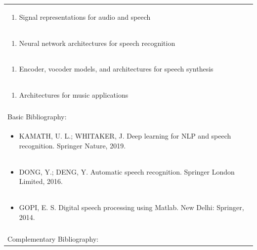 \documentclass[11pt]{article}
\begin{document}
\begin{center}
\begin{longtable}{|p{4cm}|p{4cm}|p{4cm}|p{4cm}|}
\multicolumn{4}{|p{\dimexpr 16cm + 6\tabcolsep\relax}|}{\begin{enumerate}[start=2]\item Signal representations for audio and speech\end{enumerate}}\\
\multicolumn{4}{|p{\dimexpr 16cm + 6\tabcolsep\relax}|}{\begin{enumerate}[start=3]\item Neural network architectures for speech recognition\end{enumerate}}\\
\multicolumn{4}{|p{\dimexpr 16cm + 6\tabcolsep\relax}|}{\begin{enumerate}[start=4]\item Encoder, vocoder models, and architectures for speech synthesis\end{enumerate}}\\
\multicolumn{4}{|p{\dimexpr 16cm + 6\tabcolsep\relax}|}{\begin{enumerate}[start=5]\item Architectures for music applications\end{enumerate}}\\
\multicolumn{4}{|p{\dimexpr 16cm + 6\tabcolsep\relax}|}{}\\
\hline
\multicolumn{4}{|p{16cm}|}{Basic Bibliography:}\\*
\multicolumn{4}{|p{\dimexpr 16cm + 6\tabcolsep\relax}|}{\begin{itemize}\item KAMATH, U. L.; WHITAKER, J. Deep learning for NLP and speech recognition. Springer Nature, 2019.\end{itemize}}\\
\multicolumn{4}{|p{\dimexpr 16cm + 6\tabcolsep\relax}|}{\begin{itemize}\item DONG, Y.; DENG, Y. Automatic speech recognition. Springer London Limited, 2016.\end{itemize}}\\
\multicolumn{4}{|p{\dimexpr 16cm + 6\tabcolsep\relax}|}{\begin{itemize}\item GOPI, E. S. Digital speech processing using Matlab. New Delhi: Springer, 2014.\end{itemize}}\\
\multicolumn{4}{|p{16cm}|}{}\\
\hline
\multicolumn{4}{|p{16cm}|}{Complementary Bibliography:}\\*

\end{longtable}
\end{center}
\end{document}
